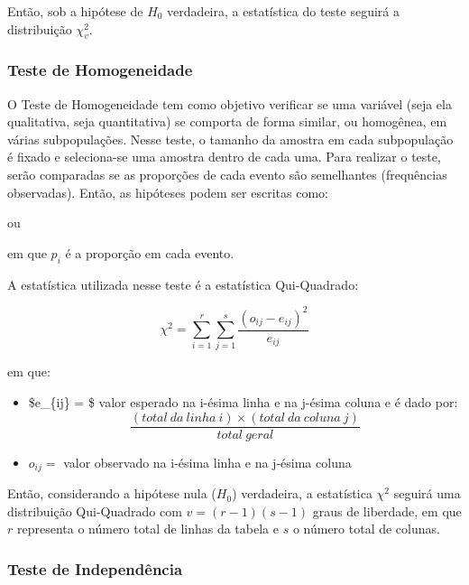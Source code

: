 \documentclass[
  portuguese,
]{estat/estat}
\begin{document}
Então, sob a hipótese de \(H_{0}\) verdadeira, a estatística do teste
seguirá a distribuição \(\chi_{v}^{2}\).

\subsubsection{Teste de Homogeneidade}\label{teste-de-homogeneidade}

O Teste de Homogeneidade tem como objetivo verificar se uma variável
(seja ela qualitativa, seja quantitativa) se comporta de forma similar,
ou homogênea, em várias subpopulações. Nesse teste, o tamanho da amostra
em cada subpopulação é fixado e seleciona-se uma amostra dentro de cada
uma. Para realizar o teste, serão comparadas se as proporções de cada
evento são semelhantes (frequências observadas). Então, as hipóteses
podem ser escritas como:


ou


em que \(p_{i}\) é a proporção em cada evento.

A estatística utilizada nesse teste é a estatística Qui-Quadrado:

\[ \chi^{2} = \displaystyle\sum_{i=1}^r \sum_{j=1}^s \frac{ {(o_{ij} - e_{ij})}^2}{e_{ij}} \]

em que:

\begin{itemize}
\item
  \$e\_\{ij\} = \$ valor esperado na i-ésima linha e na j-ésima coluna e
  é dado por:
  \[ \frac{(total\ da\ linha\ i) \times (total\ da\ coluna\ j)}{total\ geral} \]
\item
  \(o_{ij} =\) valor observado na i-ésima linha e na j-ésima coluna
\end{itemize}

Então, considerando a hipótese nula (\(H_{0}\)) verdadeira, a
estatística \(\chi^{2}\) seguirá uma distribuição Qui-Quadrado com
\(v = (r - 1)(s - 1)\) graus de liberdade, em que \(r\) representa o
número total de linhas da tabela e \(s\) o número total de colunas.

\subsubsection{Teste de Independência}\label{teste-de-independuxeancia}
\end{document}
